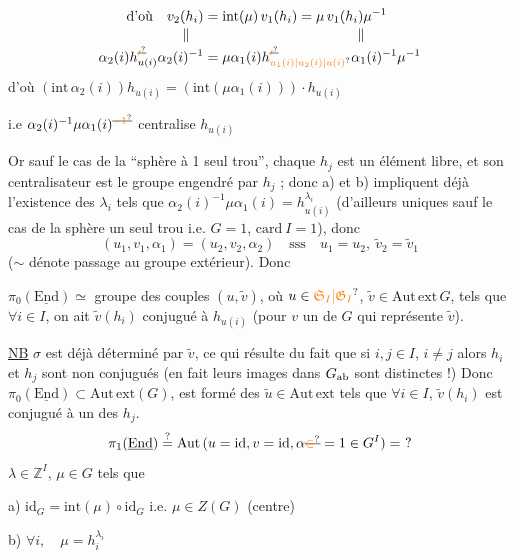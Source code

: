 \[
\begin{aligned}
\text{d'où}\quad v_2(h_i)&=\mathrm{int}(\mu)\,v_1(h_i)=\mu\,v_1(h_i)\mu^{-1}\\[-2pt]
\Vert\quad &\hspace{11em}\Vert\\[-2pt]
\alpha_2(i)h_{u(i)}^{\deleted{\unsure{\prime}}}\alpha_2(i)^{-1}
&=\mu\alpha_1(i)h_{\unsure{u_1(i)|u_2(i)|u(i)}}^{\deleted{\unsure{\prime}}}\alpha_1(i)^{-1}\mu^{-1}
\end{aligned}
\]
d'où \quad $(\mathrm{int}\,\alpha_2(i))h_{u(i)}=(\mathrm{int}(\mu\alpha_1(i)))\cdot h_{u(i)}$

i.e  $\alpha_2(i)^{-1}\mu\alpha_1(i)^{\deleted{\unsure{-1}}}$ centralise $h_{u(i)}$

Or sauf le cas de la ``sphère à 1 seul trou'', chaque $h_j$ est un élément libre, et  son centralisateur est le groupe engendré par $h_j$ ;  donc a) et b) impliquent déjà l'existence des $\lambda_i$ tels que $\alpha_2(i)^{-1}\mu\alpha_1(i)=h_{u(i)}^{\lambda_i}$ (d'ailleurs uniques sauf le cas de la sphère  un seul trou i.e. $G=1$, $\mathrm{card}\ I=1$), donc
\[
(u_1,v_1,\alpha_1)=(u_2,v_2,\alpha_2)\quad\text{sss}\quad u_1=u_2,\ \widetilde v_2=\widetilde v_1
\]
($\sim$ dénote passage au groupe extérieur). Donc

$\pi_0(\underline{\mathrm{End}})\simeq$ groupe des couples $(u,\widetilde v)$, où $u\in\unsure{\mathfrak S_I|\mathfrak G_I}$, $\widetilde v\in\mathrm{Aut\,ext}\,G$, tels que $\forall i\in I$, on ait $\widetilde v(h_i)$ conjugué à $h_{u(i)}$ (pour $v$ un  de $G$ qui représente $\widetilde v$).

\uline{NB} $\sigma$ est déjà déterminé par $\widetilde v$, ce qui résulte du fait que si $i,j\in I$, $i\ne j$ alors $h_i$ et $h_j$ sont non conjugués (en fait leurs images dans $G_{\rm ab}$ sont distinctes !) Donc $\pi_0(\underline{\mathrm{End}})\subset\mathrm{Aut\,ext}(G)$, est formé des $\widetilde u\in\mathrm{Aut\,ext}$ tels que $\forall i\in I$, $\widetilde v(h_i)$ est conjugué à un des $h_j$.
\[
\pi_1(\underline{\mathrm{End}})\overset{?}{=}
\mathrm{Aut}\,(u=\mathrm{id},v=\mathrm{id},\alpha\deleted{\unsure{\in}}=1\in G^I)=\ ?
\]
$\lambda\in\mathbb Z^I$, $\mu\in G$ tels que

a) $\mathrm{id}_G=\mathrm{int}(\mu)\circ\mathrm{id}_G$ i.e. $\mu\in Z(G)$ (centre)

b) $\forall i,\quad\mu=h_i^{\lambda_i}$

